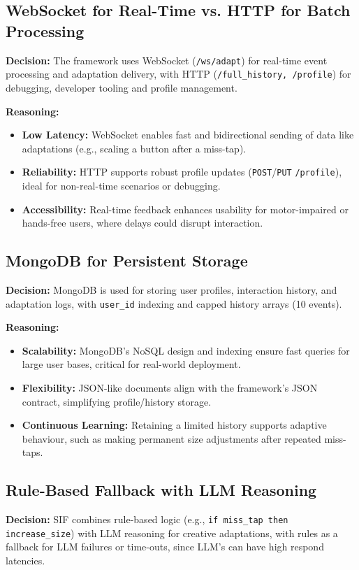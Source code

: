 \documentclass[openany]{book}
\begin{document}
\subsection{WebSocket for Real-Time vs. HTTP for Batch Processing}
\textbf{Decision:} The framework uses WebSocket (\texttt{/ws/adapt}) for real-time event processing and adaptation delivery, with HTTP (\texttt{/full\_history, /profile}) for debugging, developer tooling and profile management.

\textbf{Reasoning:}
\begin{itemize}
    \item \textbf{Low Latency:} WebSocket enables fast and bidirectional sending of data like adaptations (e.g., scaling a button after a miss-tap).
    \item \textbf{Reliability:} HTTP supports robust profile updates (\texttt{POST}/\texttt{PUT} \texttt{/profile}), ideal for non-real-time scenarios or debugging.
    \item \textbf{Accessibility:} Real-time feedback enhances usability for motor-impaired or hands-free users, where delays could disrupt interaction. 
\end{itemize}

\subsection{MongoDB for Persistent Storage}
\textbf{Decision:} MongoDB is used for storing user profiles, interaction history, and adaptation logs, with \texttt{user\_id} indexing and capped history arrays (10 events).

\textbf{Reasoning:}
\begin{itemize}
  \item \textbf{Scalability:} MongoDB’s NoSQL design and indexing ensure fast queries for large user bases, critical for real-world deployment.
  \item \textbf{Flexibility:} JSON-like documents align with the framework’s JSON contract, simplifying profile/history storage.
  \item \textbf{Continuous Learning:} Retaining a limited history supports adaptive behaviour, such as making permanent size adjustments after repeated miss-taps.
\end{itemize}

\subsection{Rule-Based Fallback with LLM Reasoning}
\textbf{Decision:} SIF combines rule-based logic (e.g., \texttt{if miss\_tap then increase\_size}) with LLM reasoning for creative adaptations, with rules as a fallback for LLM failures or time-outs, since LLM's can have high respond latencies.
\end{document}
